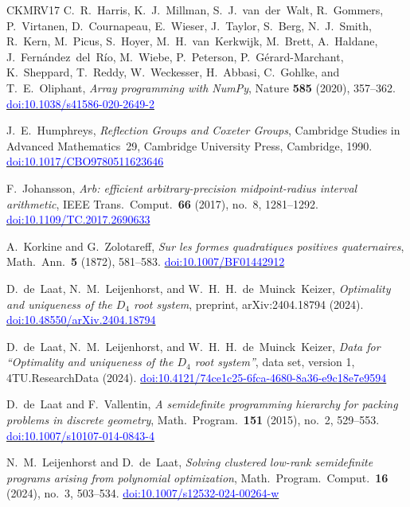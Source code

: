 \documentclass[11pt,reqno]{amsart}
\newcommand{\bluelink}[2]{\href{#1}{\textcolor{blue}{#2}}}
\renewcommand{\_}{\origunderscore\allowbreak}
\numberwithin{equation}{section}
\theoremstyle{plain}
\theoremstyle{definition}
\theoremstyle{remark}
\begin{document}
\begin{thebibliography}{CKMRV17}
C.~R.~Harris, K.~J.~Millman, S.~J.~van~der~Walt, R.~Gommers,
P.~Virtanen, D.~Cournapeau, E.~Wieser, J.~Taylor, S.~Berg,
N.~J.~Smith, R.~Kern, M.~Picus, S.~Hoyer, M.~H.~van~Kerkwijk,
M.~Brett, A.~Haldane, J.~Fern\'andez~del~R\'io, M.~Wiebe,
P.~Peterson, P.~G\'erard-Marchant, K.~Sheppard, T.~Reddy,
W.~Weckesser, H.~Abbasi, C.~Gohlke, and T.~E.~Oliphant,
\textit{Array programming with {N}um{P}y},
Nature \textbf{585} (2020), 357--362.
\bluelink{https://doi.org/10.1038/s41586-020-2649-2}{doi:10.1038/s41586-020-2649-2}

J.~E.~Humphreys,
\textit{Reflection Groups and Coxeter Groups},
Cambridge Studies in Advanced Mathematics~29,
Cambridge University Press, Cambridge, 1990.
\bluelink{https://doi.org/10.1017/CBO9780511623646}{doi:10.1017/CBO9780511623646}

F.~Johansson,
\textit{Arb: efficient arbitrary-precision midpoint-radius interval arithmetic},
IEEE Trans.\ Comput.\ \textbf{66} (2017), no.~8, 1281--1292.
\bluelink{https://doi.org/10.1109/TC.2017.2690633}{doi:10.1109/TC.2017.2690633}

A.~Korkine and G.~Zolotareff,
\textit{Sur les formes quadratiques positives quaternaires},
Math.\ Ann.\ \textbf{5} (1872), 581--583.
\bluelink{https://doi.org/10.1007/BF01442912}{doi:10.1007/BF01442912}

D.~de~Laat, N.~M.~Leijenhorst, and W.~H.~H.~de~Muinck~Keizer,
\textit{Optimality and uniqueness of the $D_4$ root system},
preprint, arXiv:2404.18794 (2024).
\bluelink{https://doi.org/10.48550/arXiv.2404.18794}{doi:10.48550/arXiv.2404.18794}

D.~de~Laat, N.~M.~Leijenhorst, and W.~H.~H.~de~Muinck~Keizer,
\textit{Data for ``Optimality and uniqueness of the $D_4$ root system''},
data set, version 1, 4TU.ResearchData (2024).
\bluelink{https://doi.org/10.4121/74ce1c25-6fca-4680-8a36-e9c18e7e9594}{doi:10.4121/74ce1c25-6fca-4680-8a36-e9c18e7e9594}

D.~de~Laat and F.~Vallentin,
\textit{A semidefinite programming hierarchy for packing problems in
discrete geometry},
Math.\ Program.\ \textbf{151} (2015), no.~2, 529--553.
\bluelink{https://doi.org/10.1007/s10107-014-0843-4}{doi:10.1007/s10107-014-0843-4}

N.~M.~Leijenhorst and D.~de~Laat,
\textit{Solving clustered low-rank semidefinite programs arising from
polynomial optimization},
Math.\ Program.\ Comput.\ \textbf{16} (2024), no.~3, 503--534.
\bluelink{https://doi.org/10.1007/s12532-024-00264-w}{doi:10.1007/s12532-024-00264-w}


\end{thebibliography}
\end{document}
